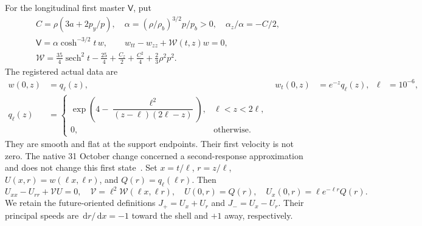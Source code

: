 \documentclass[11pt]{article}
\newcommand{\dd}{\,\mathrm d}
\begin{document}
For the longitudinal first master $\mathsf V$, put
\begin{equation}
\begin{gathered}
 C=\rho(3a+2p_y/p),\quad
 \alpha=(\rho/\rho_b)^{3/2}p/p_b>0,\quad
 \alpha_z/\alpha=-C/2,\\
 \mathsf V=\alpha\cosh^{-3/2}t\,w,\qquad
 w_{tt}-w_{zz}+\mathcal W(t,z)w=0,\\
 \mathcal W=\frac{35}{4}\operatorname{sech}^2t-\frac{25}{4}
             +\frac{C_z}{2}+\frac{C^2}{4}+\frac23\rho^2p^2 .
\end{gathered}
\label{eq:master}
\end{equation}
The registered actual data are
\begin{equation}
\begin{aligned}
 w(0,z)&=q_\ell(z),& w_t(0,z)&=e^{-z}q_\ell(z),&
 \ell&=10^{-6},\\
 q_\ell(z)&=
 \begin{cases}
 \exp\!\left(4-\dfrac{\ell^2}{(z-\ell)(2\ell-z)}\right),
                                        &\ell<z<2\ell,\\
 0,&\text{otherwise}.
 \end{cases}
\end{aligned}
\label{eq:data}
\end{equation}
They are smooth and flat at the support endpoints. Their first velocity
is not zero. The native 31 October change concerned a second-response
approximation and does not change this first state~\cite{records}.
Set $x=t/\ell$, $r=z/\ell$, $U(x,r)=w(\ell x,\ell r)$, and
$Q(r)=q_\ell(\ell r)$. Then
\begin{equation}
 U_{xx}-U_{rr}+\mathcal VU=0,\quad
 \mathcal V=\ell^2\mathcal W(\ell x,\ell r),\quad
 U(0,r)=Q(r),\quad U_x(0,r)=\ell e^{-\ell r}Q(r).
 \label{eq:scaled}
\end{equation}
We retain the future-oriented definitions
$J_+=U_x+U_r$ and $J_-=U_x-U_r$. Their principal speeds are
$\dd r/\dd x=-1$ toward the shell and $+1$ away, respectively.
\end{document}
